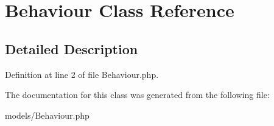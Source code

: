\hypertarget{class_behaviour}{
\section{Behaviour Class Reference}
\label{class_behaviour}
}


\subsection{Detailed Description}


Definition at line 2 of file Behaviour.php.



The documentation for this class was generated from the following file:\begin{DoxyCompactItemize}
\item 
models/Behaviour.php\end{DoxyCompactItemize}
